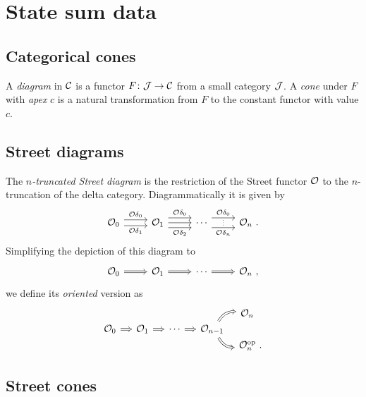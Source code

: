 
\section{State sum data}
\label{sec:statesum}

\subsection{Categorical cones}

A \textit{diagram} in $\mathcal{C}$ is a functor $F \colon \mathcal{J} \to \mathcal{C}$ from a small category $\mathcal{J}$.
A \textit{cone} under $F$ with \textit{apex} $c$ is a natural transformation from $F$ to the constant functor with value $c$.

\subsection{Street diagrams}

The \textit{$n$-truncated Street diagram} is the restriction of the Street functor $\mathcal{O}$ to the $n$-truncation of the delta category.
Diagrammatically it is given by
\[
\begin{tikzcd}
	\oriental_0
	\arrow[r,shift left=3pt, "\oriental{\delta_0}"] \arrow[r,shift right=3pt, "\oriental{\delta_1}"'] & \oriental_1
	\arrow[r,shift left=5pt, "\oriental{\delta_0}"] \arrow[r,shift right=5pt, "\oriental{\delta_2}"'] \rar &
	\dotsb
	\arrow[r,shift left=5pt, "\oriental{\delta_0}"] \arrow[r,shift right=5pt, "\oriental{\delta_n}"', "\scalebox{0.6}{$\vdots$}"] &
	\oriental_{n} \ .
\end{tikzcd}
\]
Simplifying the depiction of this diagram to
\[
\begin{tikzcd}
	\oriental_0
	\arrow[r, Rightarrow] & \oriental_1
	\arrow[r, Rightarrow] & \dotsb
	\arrow[r, Rightarrow] & \oriental_n \ ,
\end{tikzcd}
\]
we define its \textit{oriented} version as
\[
\begin{tikzcd}[column sep=small, row sep=0]
	& & & &[-5pt] \oriental_n \ \ \\
	\oriental_0
	\arrow[r, Rightarrow] & \oriental_1
	\arrow[r, Rightarrow] & \dotsb
	\arrow[r, Rightarrow] & \oriental_{n-1}
	\arrow[ur, Rightarrow, bend left] \arrow[dr, Rightarrow, bend right] & \\
	& & & & \oriental_n^\op \ .
\end{tikzcd}
\]

\subsection{Street cones}

